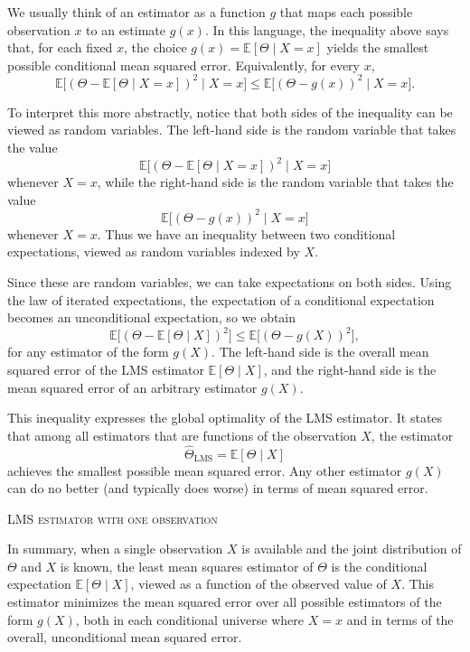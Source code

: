 We usually think of an estimator as a function \(g\) that maps each possible observation \(x\) to an estimate \(g(x)\).  
In this language, the inequality above says that, for each fixed \(x\), the choice \(g(x) = \mathbb{E}[\Theta \mid X = x]\) yields the smallest possible conditional mean squared error.  
Equivalently, for every \(x\),
\[
\mathbb{E}\big[(\Theta - \mathbb{E}[\Theta \mid X = x])^{2} \mid X = x\big]
\leq
\mathbb{E}\big[(\Theta - g(x))^{2} \mid X = x\big].
\]

To interpret this more abstractly, notice that both sides of the inequality can be viewed as random variables.  
The left-hand side is the random variable that takes the value
\[
\mathbb{E}\big[(\Theta - \mathbb{E}[\Theta \mid X = x])^{2} \mid X = x\big]
\]
whenever \(X = x\), while the right-hand side is the random variable that takes the value
\[
\mathbb{E}\big[(\Theta - g(x))^{2} \mid X = x\big]
\]
whenever \(X = x\).  
Thus we have an inequality between two conditional expectations, viewed as random variables indexed by \(X\).

Since these are random variables, we can take expectations on both sides.  
Using the law of iterated expectations, the expectation of a conditional expectation becomes an unconditional expectation, so we obtain
\[
\mathbb{E}\big[(\Theta - \mathbb{E}[\Theta \mid X])^{2}\big]
\leq
\mathbb{E}\big[(\Theta - g(X))^{2}\big],
\]
for any estimator of the form \(g(X)\).  
The left-hand side is the overall mean squared error of the LMS estimator \(\mathbb{E}[\Theta \mid X]\), and the right-hand side is the mean squared error of an arbitrary estimator \(g(X)\).

This inequality expresses the global optimality of the LMS estimator.  
It states that among all estimators that are functions of the observation \(X\), the estimator
\[
\hat{\Theta}_{\text{LMS}}
=
\mathbb{E}[\Theta \mid X]
\]
achieves the smallest possible mean squared error.  
Any other estimator \(g(X)\) can do no better (and typically does worse) in terms of mean squared error.

\bigskip
\textsc{LMS estimator with one observation}

In summary, when a single observation \(X\) is available and the joint distribution of \(\Theta\) and \(X\) is known, the least mean squares estimator of \(\Theta\) is the conditional expectation \(\mathbb{E}[\Theta \mid X]\), viewed as a function of the observed value of \(X\).  
This estimator minimizes the mean squared error over all possible estimators of the form \(g(X)\), both in each conditional universe where \(X = x\) and in terms of the overall, unconditional mean squared error.


